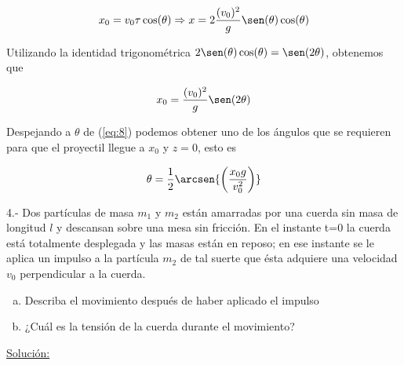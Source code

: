 \documentclass[a4paper,10pt]{article}
\begin{document}
\begin{equation*}
 x_0 = v_0 \tau \cos(\theta) \Rightarrow x = 2 \frac{(v_0)^2}{g} \sen(\theta)\cos(\theta)
\end{equation*}

Utilizando la identidad trigonométrica $2\sen(\theta)\cos(\theta) = \sen (2\theta)$,
obtenemos que

\begin{equation}
 x_0 = \frac{(v_0)^2}{g} \sen(2\theta)
 \label{eq:8}
\end{equation}

Despejando a $\theta$ de (\ref{eq:8}) podemos obtener uno de los ángulos que se 
requieren para que el proyectil llegue a $x_0$ y $z=0$, esto es


\begin{equation}
 \theta = \frac{1}{2} \arcsen{\left(\frac{x_0 g}{v_0^2}\right)}
 \label{eq:9}
\end{equation}


















\vspace{.3cm}

4.- Dos partículas de masa $m_1$ y $m_2$ están amarradas por una cuerda sin masa de 
longitud $l$ y descansan sobre una mesa sin fricción. En el instante t=0 la cuerda
está totalmente desplegada y las masas están en reposo; en ese instante se le aplica
un impulso a la partícula $m_2$ de tal suerte que ésta adquiere una velocidad $v_0$ 
perpendicular a la cuerda.

\begin{enumerate}[a)]
 \item Describa el movimiento después de haber aplicado el impulso
 \item ¿Cuál es la tensión de la cuerda durante el movimiento?
\end{enumerate}

\vspace{.3cm}

\underline{Solución:}\vspace{.3cm}
\end{document}
